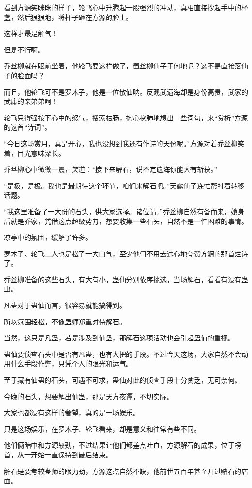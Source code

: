 \begin{this_body}
看到方源笑眯眯的样子，轮飞心中升腾起一股强烈的冲动，真相直接抄起手中的杯盏，然后狠狠地，将杯子砸在方源的脸上。

这样才最是解气！

但是不行啊。

乔丝柳就在眼前坐着，他轮飞要这样做了，置丝柳仙子于何地呢？这不是直接落仙子的脸面吗？

而且，他轮飞可不是罗木子，他是一位散仙呐。反观武遗海却是身份高贵，武家的武庸的亲弟弟啊！

轮飞只得强按下心中的怒气，搜索枯肠，掏心挖肺地想出一些词句，来“赏析”方源的这首“诗词”。

“今日这场赏月，真是开心，我也没想到我还有作诗的天份呢。”方源对着乔丝柳笑着，目光意味深长。

乔丝柳心中微微一震，笑道：“接下来解石，说不定遗海你能大有斩获。”

“是极，是极。我也是最期待这个环节，咱们来解石吧。”天露仙子连忙帮衬着转移话题。

“我这里准备了一大份的石头，供大家选择。诸位请。”乔丝柳自然有备而来，她身后就是乔家，凭借这点超级势力，想要收集一些石头，自然不是一件困难的事情。

凉亭中的氛围，缓解了许多。

罗木子、轮飞二人也是松了一大口气，至少他们不用去违心地夸赞方源的那首烂诗了。

乔丝柳准备的这些石头，有大有小，蛊仙分别依序挑选，当场解石，看看有没有蛊虫。

凡蛊对于蛊仙而言，很容易就能搞得到。

所以氛围轻松，不像蛊师郑重对待解石。

当然，这只是凡蛊，若是涉及到仙蛊，那解石这项活动也会引起蛊仙的重视。

蛊仙要侦查石头中是否有凡蛊，也有大把的手段。不过今天这场，大家自然不会动用什么手段作弊，只凭个人的眼光和运气。

至于藏有仙蛊的石头，可遇不可求，蛊仙对此的侦查手段十分贫乏，无可奈何。

今晚的石头，想要解出仙蛊，那是天方夜谭，不切实际。

大家也都没有这样的奢望，真的是一场娱乐。

只是这场娱乐，在罗木子、轮飞看来，却是意义和往常有些不同。

他们俩暗中和方源较劲，不过结果让他们都差点吐血，方源解石的成果，位于榜首，从一开始一直保持到最后结束。

解石是要考较蛊师的眼力劲，方源这点自然不缺，他前世五百年甚至开过赌石的店面。


\end{this_body}

